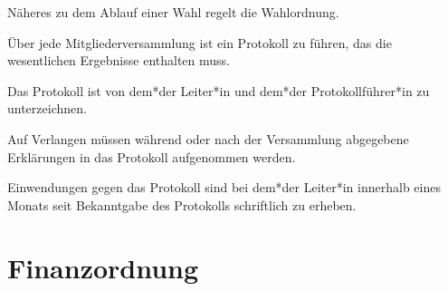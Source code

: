 \begin{gfmitglieder}
  Näheres zu dem Ablauf einer Wahl regelt die Wahlordnung.


  Über jede Mitgliederversammlung ist ein Protokoll zu führen, das die wesentlichen Ergebnisse enthalten muss.

  Das Protokoll ist von dem*der Leiter*in und dem*der Protokollführer*in zu unterzeichnen.

  Auf Verlangen müssen während oder nach der Versammlung abgegebene Erklärungen in das Protokoll aufgenommen werden.

  Einwendungen gegen das Protokoll sind bei dem*der Leiter*in innerhalb eines Monats seit Bekanntgabe des Protokolls schriftlich zu erheben.

\end{gfmitglieder}

\section{Finanzordnung}

